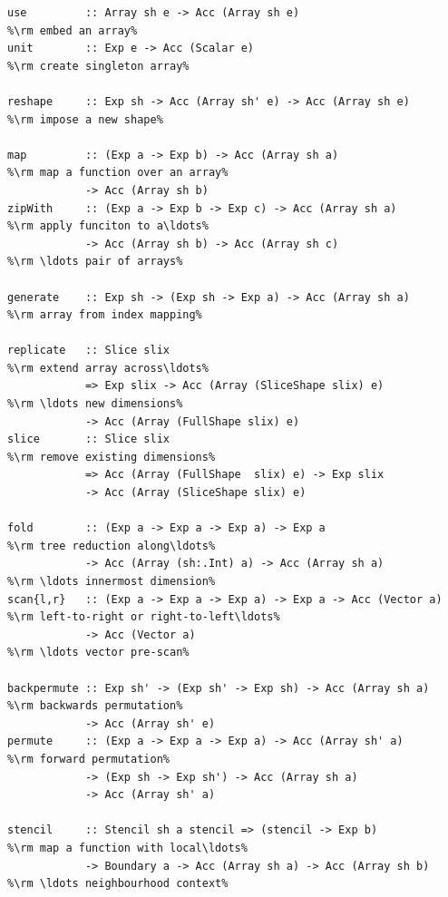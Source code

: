 \begin{lstlisting}[style=haskell_float,
    numbers=none,
    float=t,
    label={lst:acc_operations},
    caption={[Core Accelerate array operations] Summary of Accelerate's core
        collective array operations, omitting \code{Shape} and \code{Elt} class
        constraints for brevity. In addition, there are other flavours of folds
        and scans as well as segmented versions of these.}]
use         :: Array sh e -> Acc (Array sh e)                         %\rm embed an array%
unit        :: Exp e -> Acc (Scalar e)                                %\rm create singleton array%

reshape     :: Exp sh -> Acc (Array sh' e) -> Acc (Array sh e)        %\rm impose a new shape%

map         :: (Exp a -> Exp b) -> Acc (Array sh a)                   %\rm map a function over an array%
            -> Acc (Array sh b)
zipWith     :: (Exp a -> Exp b -> Exp c) -> Acc (Array sh a)          %\rm apply funciton to a\ldots%
            -> Acc (Array sh b) -> Acc (Array sh c)                   %\rm \ldots pair of arrays%

generate    :: Exp sh -> (Exp sh -> Exp a) -> Acc (Array sh a)        %\rm array from index mapping%

replicate   :: Slice slix                                             %\rm extend array across\ldots%
            => Exp slix -> Acc (Array (SliceShape slix) e)            %\rm \ldots new dimensions%
            -> Acc (Array (FullShape slix) e)
slice       :: Slice slix                                             %\rm remove existing dimensions%
            => Acc (Array (FullShape  slix) e) -> Exp slix
            -> Acc (Array (SliceShape slix) e)

fold        :: (Exp a -> Exp a -> Exp a) -> Exp a                     %\rm tree reduction along\ldots%
            -> Acc (Array (sh:.Int) a) -> Acc (Array sh a)            %\rm \ldots innermost dimension%
scan{l,r}   :: (Exp a -> Exp a -> Exp a) -> Exp a -> Acc (Vector a)   %\rm left-to-right or right-to-left\ldots%
            -> Acc (Vector a)                                         %\rm \ldots vector pre-scan%

backpermute :: Exp sh' -> (Exp sh' -> Exp sh) -> Acc (Array sh a)     %\rm backwards permutation%
            -> Acc (Array sh' e)
permute     :: (Exp a -> Exp a -> Exp a) -> Acc (Array sh' a)         %\rm forward permutation%
            -> (Exp sh -> Exp sh') -> Acc (Array sh a)
            -> Acc (Array sh' a)

stencil     :: Stencil sh a stencil => (stencil -> Exp b)             %\rm map a function with local\ldots%
            -> Boundary a -> Acc (Array sh a) -> Acc (Array sh b)     %\rm \ldots neighbourhood context%
\end{lstlisting}

